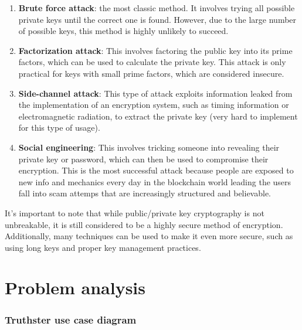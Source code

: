 \documentclass[target=mst,aauheader=]{thud}
\begin{document}
    \begin{enumerate}

        \item \textbf{Brute force attack}: the most classic method. It involves trying all possible private keys until the correct one is found. However, due to the large number of possible keys, this method is highly unlikely to succeed.
        \item \textbf{Factorization attack}: This involves factoring the public key into its prime factors, which can be used to calculate the private key. This attack is only practical for keys with small prime factors, which are considered insecure.
        \item \textbf{Side-channel attack}: This type of attack exploits information leaked from the implementation of an encryption system, such as timing information or electromagnetic radiation, to extract the private key (very hard to implement for this type of usage).
        \item \textbf{Social engineering}: This involves tricking someone into revealing their private key or password, which can then be used to compromise their encryption. This is the most successful attack because people are exposed to new info and mechanics every day in the blockchain world leading the users fall into scam attemps that are increasingly structured and believable.

    \end{enumerate}

    It's important to note that while public/private key cryptography is not unbreakable, it is still considered to be a highly secure method of encryption. Additionally, many techniques can be used to make it even more secure, such as using long keys and proper key management practices.
    







\chapter{Problem analysis}
\label{problemAnalysis}



\subsection{Truthster use case diagram}
\end{document}
